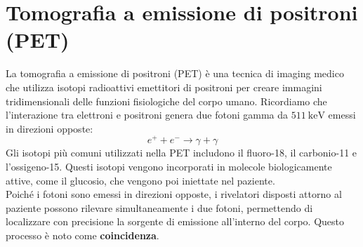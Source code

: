 \section{Tomografia a emissione di positroni (PET)}
La tomografia a emissione di positroni (PET) è una tecnica di imaging medico che utilizza isotopi radioattivi emettitori di positroni per creare immagini tridimensionali delle funzioni fisiologiche del corpo umano. Ricordiamo che l'interazione tra elettroni e positroni genera due fotoni gamma da $\qty{511}{\kilo\electronvolt}$ emessi in direzioni opposte:
\begin{equation}
    e^+ + e^- \to \gamma + \gamma
\end{equation}
Gli isotopi più comuni utilizzati nella PET includono il fluoro-18, il carbonio-11 e l'ossigeno-15. Questi isotopi vengono incorporati in molecole biologicamente attive, come il glucosio, che vengono poi iniettate nel paziente.\\
Poiché i fotoni sono emessi in direzioni opposte, i rivelatori disposti attorno al paziente possono rilevare simultaneamente i due fotoni, permettendo di localizzare con precisione la sorgente di emissione all'interno del corpo. Questo processo è noto come \textbf{coincidenza}.\\ %

